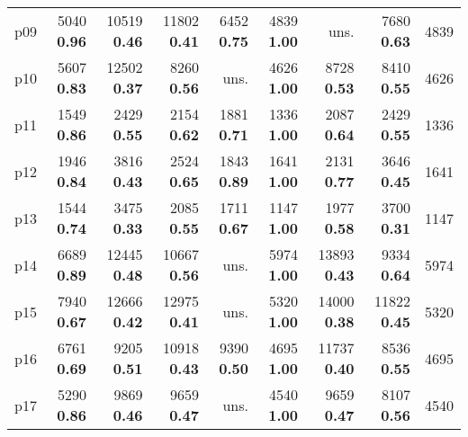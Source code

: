 \begin{tabular}{|l|rrrrrrr|r|}
p09 & {\footnotesize 5040} \textbf{0.96} & {\footnotesize 10519} \textbf{0.46} & {\footnotesize 11802} \textbf{0.41} & {\footnotesize 6452} \textbf{0.75} & {\footnotesize 4839} \textbf{1.00} & uns. & {\footnotesize 7680} \textbf{0.63} & 4839\\
p10 & {\footnotesize 5607} \textbf{0.83} & {\footnotesize 12502} \textbf{0.37} & {\footnotesize 8260} \textbf{0.56} & uns. & {\footnotesize 4626} \textbf{1.00} & {\footnotesize 8728} \textbf{0.53} & {\footnotesize 8410} \textbf{0.55} & 4626\\
p11 & {\footnotesize 1549} \textbf{0.86} & {\footnotesize 2429} \textbf{0.55} & {\footnotesize 2154} \textbf{0.62} & {\footnotesize 1881} \textbf{0.71} & {\footnotesize 1336} \textbf{1.00} & {\footnotesize 2087} \textbf{0.64} & {\footnotesize 2429} \textbf{0.55} & 1336\\
p12 & {\footnotesize 1946} \textbf{0.84} & {\footnotesize 3816} \textbf{0.43} & {\footnotesize 2524} \textbf{0.65} & {\footnotesize 1843} \textbf{0.89} & {\footnotesize 1641} \textbf{1.00} & {\footnotesize 2131} \textbf{0.77} & {\footnotesize 3646} \textbf{0.45} & 1641\\
p13 & {\footnotesize 1544} \textbf{0.74} & {\footnotesize 3475} \textbf{0.33} & {\footnotesize 2085} \textbf{0.55} & {\footnotesize 1711} \textbf{0.67} & {\footnotesize 1147} \textbf{1.00} & {\footnotesize 1977} \textbf{0.58} & {\footnotesize 3700} \textbf{0.31} & 1147\\
p14 & {\footnotesize 6689} \textbf{0.89} & {\footnotesize 12445} \textbf{0.48} & {\footnotesize 10667} \textbf{0.56} & uns. & {\footnotesize 5974} \textbf{1.00} & {\footnotesize 13893} \textbf{0.43} & {\footnotesize 9334} \textbf{0.64} & 5974\\
p15 & {\footnotesize 7940} \textbf{0.67} & {\footnotesize 12666} \textbf{0.42} & {\footnotesize 12975} \textbf{0.41} & uns. & {\footnotesize 5320} \textbf{1.00} & {\footnotesize 14000} \textbf{0.38} & {\footnotesize 11822} \textbf{0.45} & 5320\\
p16 & {\footnotesize 6761} \textbf{0.69} & {\footnotesize 9205} \textbf{0.51} & {\footnotesize 10918} \textbf{0.43} & {\footnotesize 9390} \textbf{0.50} & {\footnotesize 4695} \textbf{1.00} & {\footnotesize 11737} \textbf{0.40} & {\footnotesize 8536} \textbf{0.55} & 4695\\
p17 & {\footnotesize 5290} \textbf{0.86} & {\footnotesize 9869} \textbf{0.46} & {\footnotesize 9659} \textbf{0.47} & uns. & {\footnotesize 4540} \textbf{1.00} & {\footnotesize 9659} \textbf{0.47} & {\footnotesize 8107} \textbf{0.56} & 4540\\

\end{tabular}
